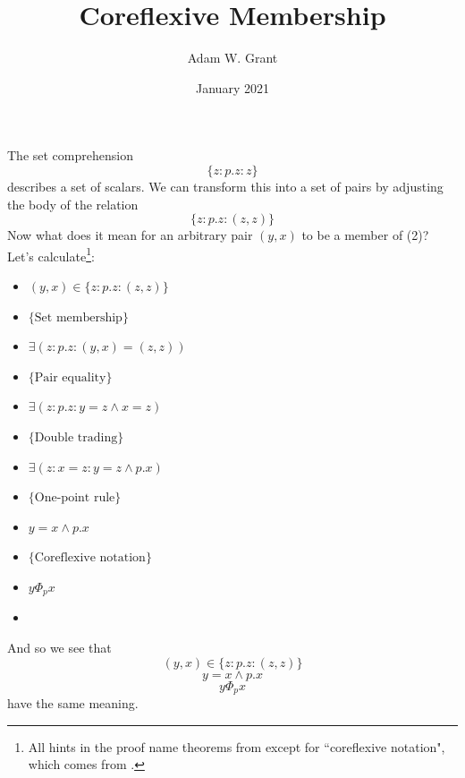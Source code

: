 \documentclass{article}
\title{Coreflexive Membership}
\author{Adam W. Grant}
\date{January 2021}
\begin{document}
\maketitle
The set comprehension
\begin{equation}
    \{ z : p.z : z\}
\end{equation}
describes a set of scalars.  We can transform this into a set of pairs by adjusting the body of the relation
\begin{equation}
    \{ z : p.z : (z,z)\}
\end{equation}
Now what does it mean for an arbitrary pair $(y,x)$ to be a member of (2)?  Let's calculate\footnote{All hints in the proof name theorems from \cite{10.5555/1963395} except for ``coreflexive notation", which comes from \cite{Oliveira2009}.}:
\begin{itemize}
    \item $(y,x) \in \{ z : p.z : (z,z)\}$
    \item[$\equiv$] $\{\text{Set membership}\}$
    \item[] $\exists(z : p.z : (y,x) = (z,z))$
    \item[$\equiv$] $\{\text{Pair equality}\}$
    \item[] $\exists(z : p.z : y=z \wedge x=z)$
    \item[$\equiv$] $\{\text{Double trading}\}$
    \item[] $\exists(z : x=z : y=z \wedge p.x)$
    \item[$\equiv$] $\{\text{One-point rule}\}$
    \item[] $y=x \wedge p.x$
    \item[$\equiv$] $\{\text{Coreflexive notation}\}$
    \item[] $y \Phi_{p} x$
    \item[\Heart]
\end{itemize}
And so we see that
\begin{equation*}
    (y,x) \in \{ z : p.z : (z,z)\}
\end{equation*}
\begin{equation*}
    y=x \wedge p.x
\end{equation*}
\begin{equation*}
    y \Phi_{p} x
\end{equation*}
have the same meaning.


\end{document}
